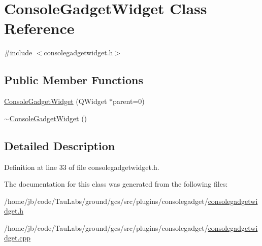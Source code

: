 \hypertarget{class_console_gadget_widget}{\section{\-Console\-Gadget\-Widget \-Class \-Reference}
\label{class_console_gadget_widget}
}


{\ttfamily \#include $<$consolegadgetwidget.\-h$>$}

\subsection*{\-Public \-Member \-Functions}
\begin{DoxyCompactItemize}
\item 
\hyperlink{group___console_plugin_gaf36f2dbb51922f2b8cea7297df751bde}{\-Console\-Gadget\-Widget} (\-Q\-Widget $\ast$parent=0)
\item 
\hyperlink{group___console_plugin_ga8f28b960cce5aee7f66b35e0fb38fd12}{$\sim$\-Console\-Gadget\-Widget} ()
\end{DoxyCompactItemize}


\subsection{\-Detailed \-Description}


\-Definition at line 33 of file consolegadgetwidget.\-h.



\-The documentation for this class was generated from the following files\-:\begin{DoxyCompactItemize}
\item 
/home/jb/code/\-Tau\-Labs/ground/gcs/src/plugins/consolegadget/\hyperlink{consolegadgetwidget_8h}{consolegadgetwidget.\-h}\item 
/home/jb/code/\-Tau\-Labs/ground/gcs/src/plugins/consolegadget/\hyperlink{consolegadgetwidget_8cpp}{consolegadgetwidget.\-cpp}\end{DoxyCompactItemize}
